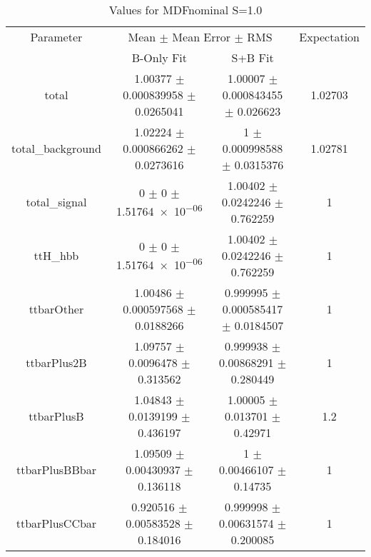 \begin{table}
\centering
\caption{Values for MDFnominal S=1.0}
\begin{tabular}{cccc}
\toprule
Parameter & \multicolumn{2}{c}{Mean $\pm$ Mean Error $\pm$ RMS} & Expectation\\
 & B-Only Fit & S+B Fit & \\
\midrule
total & \num{1.00377} $\pm$ \num{0.000839958} $\pm$ \num{0.0265041} & \num{1.00007} $\pm$ \num{0.000843455} $\pm$ \num{0.026623} & \num{1.02703}\\
total\_background & \num{1.02224} $\pm$ \num{0.000866262} $\pm$ \num{0.0273616} & \num{1} $\pm$ \num{0.000998588} $\pm$ \num{0.0315376} & \num{1.02781}\\
total\_signal & \num{0} $\pm$ \num{0} $\pm$ \num{1.51764e-06} & \num{1.00402} $\pm$ \num{0.0242246} $\pm$ \num{0.762259} & \num{1}\\
ttH\_hbb & \num{0} $\pm$ \num{0} $\pm$ \num{1.51764e-06} & \num{1.00402} $\pm$ \num{0.0242246} $\pm$ \num{0.762259} & \num{1}\\
ttbarOther & \num{1.00486} $\pm$ \num{0.000597568} $\pm$ \num{0.0188266} & \num{0.999995} $\pm$ \num{0.000585417} $\pm$ \num{0.0184507} & \num{1}\\
ttbarPlus2B & \num{1.09757} $\pm$ \num{0.0096478} $\pm$ \num{0.313562} & \num{0.999938} $\pm$ \num{0.00868291} $\pm$ \num{0.280449} & \num{1}\\
ttbarPlusB & \num{1.04843} $\pm$ \num{0.0139199} $\pm$ \num{0.436197} & \num{1.00005} $\pm$ \num{0.013701} $\pm$ \num{0.42971} & \num{1.2}\\
ttbarPlusBBbar & \num{1.09509} $\pm$ \num{0.00430937} $\pm$ \num{0.136118} & \num{1} $\pm$ \num{0.00466107} $\pm$ \num{0.14735} & \num{1}\\
ttbarPlusCCbar & \num{0.920516} $\pm$ \num{0.00583528} $\pm$ \num{0.184016} & \num{0.999998} $\pm$ \num{0.00631574} $\pm$ \num{0.200085} & \num{1}\\
\bottomrule
\end{tabular}
\end{table}